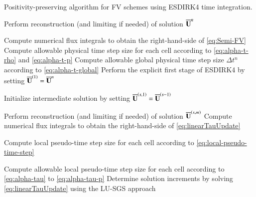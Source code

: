  \begin{algorithm}[htbp!]
        \renewcommand{\baselinestretch}{1.3}\selectfont
 	\caption{Positivity-preserving algorithm for FV schemes using ESDIRK4 time integration.}  
 	\label{alg:pp-algorithm}
 	\begin{algorithmic}[1] 
        
        \State Perform reconstruction (and limiting if needed) of solution $\overline{\mathbf{U}}^{n}$ %
                
        \State Compute numerical flux integrals to obtain the right-hand-side of \eqref{eq:Semi-FV} %
        \State Compute allowable physical time step size for each cell according to \eqref{eq:alpha-t-rho} and \eqref{eq:alpha-t-p}
        \State Compute allowable global physical time step size $\Delta t^n$ according to \eqref{eq:alpha-t-global}
        \State Perform the explicit first stage of ESDIRK4 by setting $\overline{\mathbf{U}}^{\left(1\right)} =\overline{\mathbf{U}}^{n}$ %

        \State Initialize intermediate solution by setting $\overline{\mathbf{U}}^{\left(s,1\right)}=\overline{\mathbf{U}}^{\left(s-1\right)}$ 
        

        \State Perform reconstruction (and limiting if needed) of solution $\overline{\mathbf{U}}^{\left(s,m\right)}$ %
        \State Compute numerical flux integrals to obtain the right-hand-side of \eqref{eq:linearTauUpdate} %
        
        \State Compute local pseudo-time step size for each cell according to \eqref{eq:local-pseudo-time-step}

        \State Compute allowable local pseudo-time step size for each cell according to \eqref{eq:alpha-tau} to \eqref{eq:alpha-tau-p}
        \State Determine solution increments by solving \eqref{eq:linearTauUpdate} using the LU-SGS approach  %


\end{algorithmic}
\end{algorithm}

